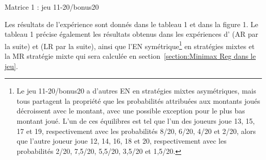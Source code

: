 \begin{Article}
\begin{refsection}[UmbhauerFR]
\begin{table}[h!]
\centering
Matrice 1 : jeu 11-20/bonus20
\label{matrice1}
\end{table}

Les résultats de l'expérience sont donnés dans le tableau 1 et dans la
figure 1. Le tableau 1 précise également les résultats obtenus dans les
expériences d'\textcite{arad2012} (AR par la suite) et \textcite{li2018} (LR par la suite), ainsi que l'EN symétrique\footnote{Le jeu 11-20/bonus20 a d'autres EN en stratégies mixtes asymétriques, mais tous partagent la propriété que les probabilités attribuées aux montants joués décroissent avec le montant, avec une possible
  exception pour le plus bas montant joué. L'un de ces équilibres est
  tel que l'un des joueurs joue 13, 15, 17 et 19, respectivement avec
  les probabilités 8/20, 6/20, 4/20 et 2/20, alors que l'autre joueur
  joue 12, 14, 16, 18 et 20, respectivement avec les probabilités 2/20,
  7,5/20, 5,5/20, 3,5/20 et 1,5/20.} en stratégies mixtes et la MR
stratégie mixte qui sera calculée en section~\ref{section:Minimax Reg dans le jeu}.


\end{refsection}
\end{Article}
